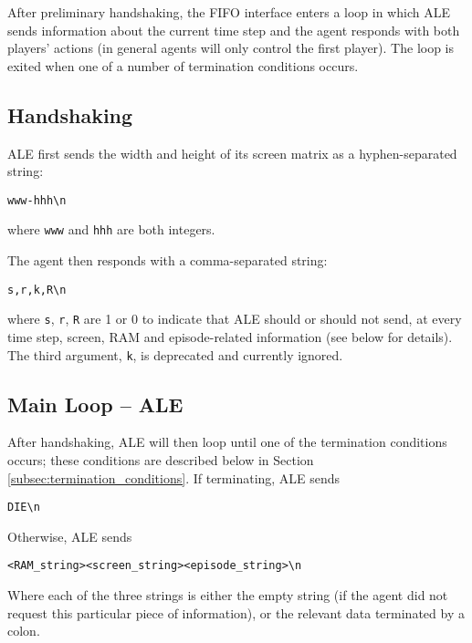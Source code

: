\documentclass[12pt]{article}
\begin{document}
After preliminary handshaking, the FIFO interface enters a loop in which ALE sends information about the current time step and the agent responds with both players' actions (in general agents will only control the first player). The loop is exited when one of a number of termination conditions occurs.

\subsection{Handshaking}

ALE first sends the width and height of its screen matrix as a hyphen-separated string:

\begin{verbatim}
www-hhh\n
\end{verbatim}

where \verb+www+ and \verb+hhh+ are both integers.

The agent then responds with a comma-separated string:

\begin{verbatim}
s,r,k,R\n
\end{verbatim}

where \verb+s+, \verb+r+, \verb+R+ are 1 or 0 to indicate that ALE should or should not send, at every time step, screen, RAM and episode-related information (see below for details). The third argument, \verb+k+, is deprecated and currently ignored.

\subsection{Main Loop -- ALE}

After handshaking, ALE will then loop until one of the termination conditions occurs; these conditions are described below in Section \ref{subsec:termination_conditions}. If terminating, ALE sends

\begin{verbatim}
DIE\n
\end{verbatim}

Otherwise, ALE sends

\begin{verbatim}
<RAM_string><screen_string><episode_string>\n
\end{verbatim}

Where each of the three strings is either the empty string (if the agent did not request this
particular piece of information), or the relevant data terminated by a colon.
\end{document}
